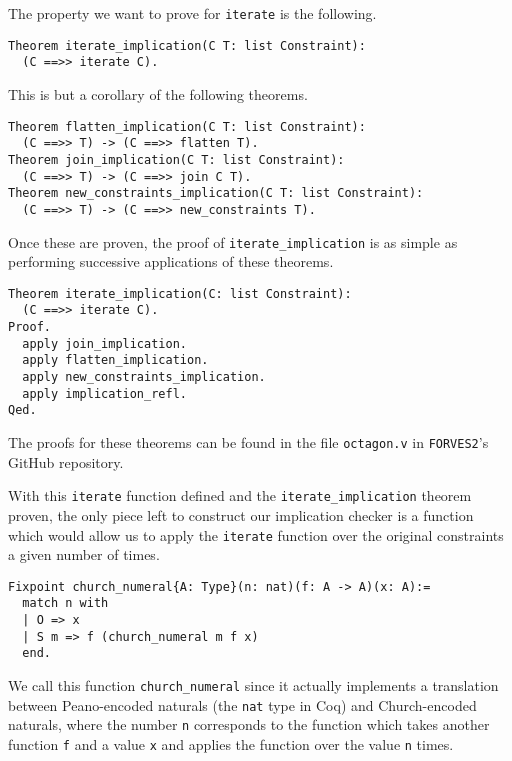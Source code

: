 The property we want to prove for \texttt{iterate} is the following.

\begin{verbatim}
Theorem iterate_implication(C T: list Constraint):
  (C ==>> iterate C).
\end{verbatim}

This is but a corollary of the following theorems.
\begin{verbatim}
Theorem flatten_implication(C T: list Constraint):
  (C ==>> T) -> (C ==>> flatten T).
Theorem join_implication(C T: list Constraint):
  (C ==>> T) -> (C ==>> join C T).
Theorem new_constraints_implication(C T: list Constraint):
  (C ==>> T) -> (C ==>> new_constraints T).
\end{verbatim}

Once these are proven, the proof of \texttt{iterate_implication} is as simple as performing
successive applications of these theorems.
\begin{verbatim}
Theorem iterate_implication(C: list Constraint):
  (C ==>> iterate C).
Proof.
  apply join_implication.
  apply flatten_implication.
  apply new_constraints_implication.
  apply implication_refl.
Qed.
\end{verbatim}

The proofs for these theorems can be found in the file \verb|octagon.v| in \verb|FORVES2|'s GitHub
repository.


With this \texttt{iterate} function defined and the \texttt{iterate_implication}
theorem proven, the only piece left to construct our implication checker is a function which would
allow us to apply the \texttt{iterate} function over the original constraints a given
number of times.

\begin{verbatim}
Fixpoint church_numeral{A: Type}(n: nat)(f: A -> A)(x: A):=
  match n with
  | O => x
  | S m => f (church_numeral m f x)
  end.
\end{verbatim}

We call this function \texttt{church_numeral} since it actually implements a translation
between Peano-encoded naturals (the \texttt{nat} type in Coq) and Church-encoded naturals,
where the number \texttt{n} corresponds to the function which takes another function 
\texttt{f} and a value \texttt{x} and applies the function over the value 
\texttt{n} times.

